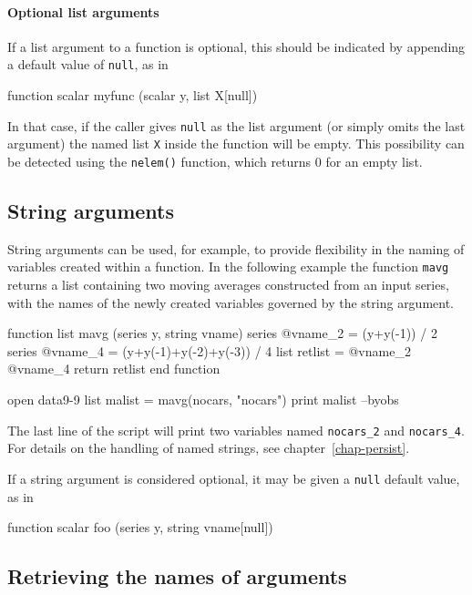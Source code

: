 \paragraph{Optional list arguments} If a list argument to a function is
optional, this should be indicated by appending a default value of
\texttt{null}, as in
%
\begin{code}
function scalar myfunc (scalar y, list X[null])
\end{code}
%
In that case, if the caller gives \texttt{null} as the list argument
(or simply omits the last argument) the named list \texttt{X} inside the
function will be empty.  This possibility can be detected using the
\texttt{nelem()} function, which returns 0 for an empty list.

\subsection{String arguments}

String arguments can be used, for example, to provide flexibility in
the naming of variables created within a function.  In the following
example the function \texttt{mavg} returns a list containing two
moving averages constructed from an input series, with the names of
the newly created variables governed by the string argument.
%
\begin{code}
function list mavg (series y, string vname)
   series @vname_2 = (y+y(-1)) / 2
   series @vname_4 = (y+y(-1)+y(-2)+y(-3)) / 4
   list retlist = @vname_2 @vname_4
   return retlist
end function

open data9-9
list malist = mavg(nocars, "nocars")
print malist --byobs
\end{code}
%
The last line of the script will print two variables named
\verb|nocars_2| and \verb|nocars_4|.  For details on the handling of
named strings, see chapter~\ref{chap-persist}.

If a string argument is considered optional, it may be given a
\texttt{null} default value, as in
%
\begin{code}
function scalar foo (series y, string vname[null])
\end{code}

\subsection{Retrieving the names of arguments}

